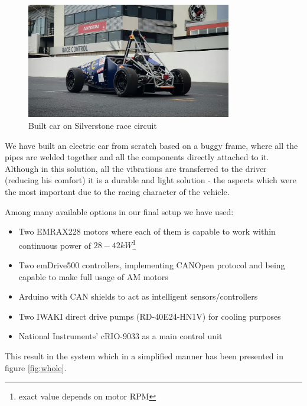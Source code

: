 \begin{figure}[b]
    \centering
        \includegraphics[width=0.8\textwidth]{figures/silverstone.jpg}
        \caption{Built car on Silverstone race circuit}
        \label{pic:silverstone}
\end{figure}


We have built an electric car from scratch based on a buggy frame, where all the pipes are welded together and all the components directly attached to it. Although in this solution, all the vibrations are transferred to the driver (reducing his comfort) it is a durable and light solution - the aspects which were the most important due to the racing character of the vehicle. 

Among many available options in our final setup we have used:
\begin{itemize}
    \item Two EMRAX228 motors where each of them is capable to work within continuous power of $28-42kW$\footnote{exact value depends on motor RPM}\cite{emrax_manual}
    \item Two emDrive500 controllers, implementing CANOpen protocol and being capable to make full usage of AM motors
    \item Arduino with CAN shields to act as intelligent sensors/controllers
    \item Two IWAKI direct drive pumps (RD-40E24-HN1V) for cooling purposes 
    \item National Instruments' cRIO-9033 as a main control unit
\end{itemize}
\newpage
This result in the system which in a simplified manner has been presented in figure \ref{fig:whole}.

